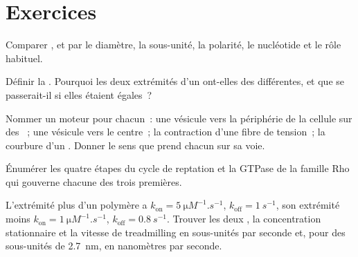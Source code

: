 \section{Exercices}

\begin{exercise}[$\star$]\label{exo:b3:cytoskeleton-motility:1}
Comparer ,  et 
par le diamètre, la sous-unité, la polarité, le nucléotide et le rôle
habituel.
\end{exercise}

\begin{exercise}[$\star$]\label{exo:b3:cytoskeleton-motility:2}
Définir la . Pourquoi les deux extrémités d'un
 ont-elles des  différentes, et
que se passerait-il si elles étaient égales~?
\end{exercise}

\begin{exercise}[$\star$]\label{exo:b3:cytoskeleton-motility:3}
Nommer un moteur pour chacun~: une vésicule vers la périphérie de la
cellule sur des ~; une vésicule vers le centre~; la
contraction d'une fibre de tension~; la courbure d'un . Donner le
sens que prend chacun sur sa voie.
\end{exercise}

\begin{exercise}[$\star$]\label{exo:b3:cytoskeleton-motility:4}
Énumérer les quatre étapes du cycle de reptation et la GTPase de la
famille Rho qui gouverne chacune des trois premières.
\end{exercise}

\begin{exercise}[$\star\star$]\label{exo:b3:cytoskeleton-motility:5}
L'extrémité plus d'un polymère a
$k_{\text{on}} = \qty{5}{\micro M^{-1}.s^{-1}}$,
$k_{\text{off}} = \qty{1}{s^{-1}}$, son extrémité moins $k_{\text{on}} =
\qty{1}{\micro M^{-1}.s^{-1}}$, $k_{\text{off}} = \qty{0.8}{s^{-1}}$.
Trouver les deux , la concentration
stationnaire et la vitesse de treadmilling en sous-unités par seconde
et, pour des sous-unités de \qty{2.7}{nm}, en nanomètres par seconde.
\end{exercise}

